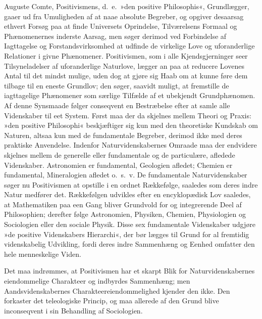 \documentclass[12pt]{book}
\newcommand{\apage}[1]{\marginnote{\footnotesize\textit{[#1]}}}
\begin{document}
Auguste Comte, Positivismens, d.\ e.\ »den positive Philosophis«,
Grundlægger, gaaer ud fra Umuligheden af at naae absolute Begreber, og
opgiver desaarsag ethvert Forsøg paa at finde Universets Oprindelse,
Tilværelsens Formaal og Phænomenernes inderste Aarsag, men søger derimod
ved Forbindelse af Iagttagelse og Forstandsvirksomhed at udfinde de
virkelige Love og uforanderlige Relationer i givne Phænomener.
Positivismen, som i alle Kjendsgjerninger seer Tilsyneladelser af
uforanderlige Naturlove, lægger an paa at reducere Lovenes Antal til det
mindst mulige, uden dog at gjøre sig Haab om at kunne føre dem tilbage til
en eneste Grundlov; den søger, saavidt muligt, at fremstille de
iagttagelige Phænomener som særlige Tilfælde af et ubekjendt
Grundphænomen. Af denne Synsmaade følger conseqvent en Bestræbelse efter at
samle alle Videnskaber til eet System. Først maa der da skjelnes mellem
Theori og Praxis: »den positive Philosophi« beskjæftiger sig kun med den
theoretiske Kundskab om Naturen, altsaa kun med de fundamentale Begreber, \apage{86} 
derimod ikke med deres praktiske Anvendelse. Indenfor Naturvidenskabernes
Omraade maa der endvidere skjelnes mellem de generelle eller fundamentale
og de particulære, afledede Videnskaber. Astronomien er fundamental,
Geologien afledet; Chemien er fundamental, Mineralogien afledet o.\ s.\ v. De
fundamentale Naturvidenskaber søger nu Positivismen at opstille i en ordnet
Rækkefølge, saaledes som deres indre Natur medfører det. Rækkefølgen
udvikles efter en encyklopædisk Lov saaledes, at Mathematiken paa een Gang
bliver Grundvold for og integrerende Deel af Philosophien; derefter følge
Astronomien, Physiken, Chemien, Physiologien og Sociologien eller den
sociale Physik. Disse sex fundamentale Videnskaber udgjøre »de positive
Videnskabers Hierarchi«, der bør lægges til Grund for al fremtidig
videnskabelig Udvikling, fordi deres indre Sammenhæng og Eenhed omfatter
den hele menneskelige Viden.

Det maa indrømmes, at Positivismen har et skarpt Blik for
Naturvidenskabernes eiendommelige Charakteer og indbyrdes Sammenhæng; men
Aandsvidenskabernes Charakteereiendommelighed kjender den ikke. Den
forkaster det teleologiske Princip, og maa allerede af den Grund blive
inconseqvent i sin Behandling af Sociologien.
\end{document}

